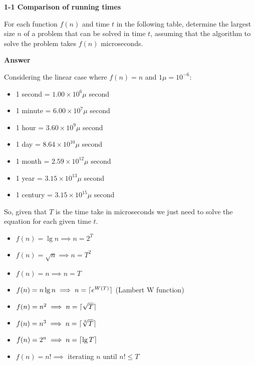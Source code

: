 \documentclass[11pt, oneside]{article}          %
\DeclarePairedDelimiter{\ceil}{\lceil}{\rceil}
\begin{document}

\textbf{1-1 Comparison of running times}

For each function $f(n)$ and time $t$ in the following table, determine the largest size $n$ of a problem that can be solved in time $t$, assuming that the algorithm to solve the problem takes $f(n)$ microseconds.

\textbf{Answer}

Considering the linear case where $f(n) = n$ and $1\mu = 10^{-6}$:

\begin{itemize}[label=,noitemsep]
  \item 1 second  = $1.00 \times 10^6\mu$ second
  \item 1 minute  = $6.00 \times 10^7\mu$ second
  \item 1 hour    = $3.60 \times 10^9\mu$ second
  \item 1 day     = $8.64 \times 10^{10}\mu$ second
  \item 1 month   = $2.59 \times 10^{12}\mu$ second
  \item 1 year    = $3.15 \times 10^{13}\mu$ second
  \item 1 century = $3.15 \times 10^{15}\mu$ second
\end{itemize}

So, given that $T$ is the time take in microseconds we just need to solve the equation for each given time $t$.

\begin{itemize}[label=,noitemsep]
  \item $f(n) = \lg n   \implies n = 2^{T}$
  \item $f(n) = \sqrt n \implies n = T^2$
  \item $f(n) = n       \implies n = T$
  \item $f(n) = n \lg n \implies n = \ceil{e^{W(T)}}$ (Lambert W function)
  \item $f(n) = n^2     \implies n = \ceil{\sqrt T}$
  \item $f(n) = n^3     \implies n = \ceil{\sqrt[3] T}$
  \item $f(n) = 2^n     \implies n = \ceil{\lg T}$
  \item $f(n) = n!      \implies $ iterating $n$ until $n! \leq T$
\end{itemize}
\end{document}
